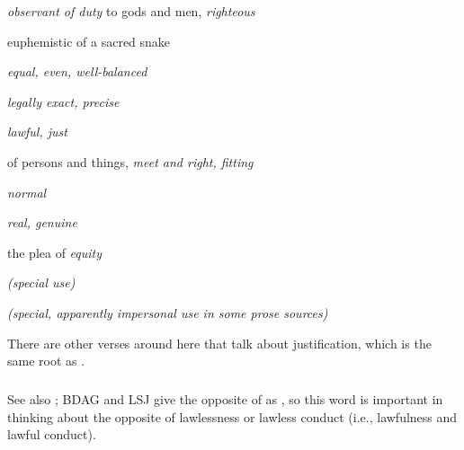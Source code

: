 \begin{compactdesc}
\begin{compactitem}
							\item[A.2] \textit{observant of duty} to gods and men, \textit{righteous}
							\item[A.3] euphemistic of a sacred snake
							\item[B.I.a] \textit{equal, even, well-balanced}
							\item[B.I.b.1] \textit{legally exact, precise}
							\item[B.I.b.2] \textit{lawful, just}
							\item[B.II.a] of persons and things, \textit{meet and right, fitting}
							\item[B.II.b.1] \textit{normal}
							\item[B.II.b.2] \textit{real, genuine} 
							\item[B.II.b.3] the plea of \textit{equity}
							\item[B.III] \textit{(special use)}
							\item[C] \textit{(special, apparently impersonal use in some prose sources)}
						\end{compactitem}
				\end{compactdesc}
				
				
				\begin{compactdesc}
					\item[Some NT uses] \textbf{}
						\begin{compactdesc}
							\item[{\hyperref[GALATIANS-3-11]{Galatians 3:11}}] \phantom{.}
								\begin{compactitem}
									\item There are other verses around here that talk about justification, which is the same root as .
								\end{compactitem}
						\end{compactdesc}
				\end{compactdesc}
		
			\subparagraph{\texorpdfstring{}{}}
				\label{DIKAIOSUNE}
				
				See also \hyperref[ANOMIA]{}; BDAG and LSJ give the opposite of  as , so this word is important in thinking about the opposite of lawlessness or lawless conduct (i.e., lawfulness and lawful conduct).
				
